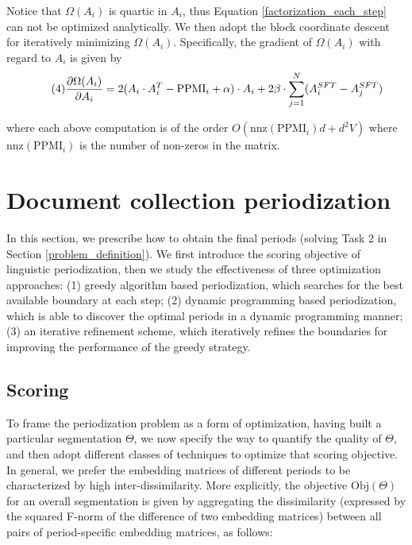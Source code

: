 \documentclass[output=paper]{langsci/langscibook}
\begin{document}
Notice that $\Omega(A_{i})$ is quartic in $A_{i}$, thus Equation \eqref{factorization_each_step} can not be optimized analytically. We then adopt the block coordinate descent \citep{tseng2001convergence} for iteratively minimizing $\Omega(A_{i})$. Specifically, the gradient of $\Omega(A_{i})$ with regard to $A_{i}$ is given by
\begin{equation}\tag{4}
\frac{\partial \Omega(A_{i}) }{\partial A_{i}} = 2(A_{i}\cdot A_{i}^{T} - \textup{PPMI}_{i} + \alpha)\cdot A_{i} + 2\beta \cdot \sum_{j = 1}^{N}(A_{i}^{SFT} - A_{j}^{SFT})
\label{gradient descent}
\end{equation}

where each above computation is of the order $O(\text{nnz}(\text{PPMI}_{i})d + d^{2}V)$ where $\text{nnz}(\text{PPMI}_{i})$ is the number of non-zeros in the matrix.

\section{Document collection periodization}

In this section, we prescribe how to obtain the final periods (solving Task 2 in Section \ref{problem_definition}). We first introduce the scoring objective of linguistic periodization, then we study the effectiveness of three optimization approaches: (1) greedy algorithm based periodization, which searches for the best available boundary at each step; (2) dynamic programming based periodization, which is able to discover the optimal periods in a dynamic programming manner; (3) an iterative refinement scheme, which iteratively refines the boundaries for improving the performance of the greedy strategy.

\subsection{Scoring}

To frame the periodization problem as a form of optimization, having built a particular segmentation $\Theta$, we now specify the way to quantify the quality of $\Theta$, and then adopt different classes of techniques to optimize that scoring objective. In general, we prefer the embedding matrices of different periods to be characterized by high inter-dissimilarity. More explicitly, the objective $\text{Obj}(\Theta)$ for an overall segmentation is given by aggregating the dissimilarity (expressed by the squared F-norm of the difference of two embedding matrices) between all pairs of period-specific embedding matrices, as follows:
\end{document}
